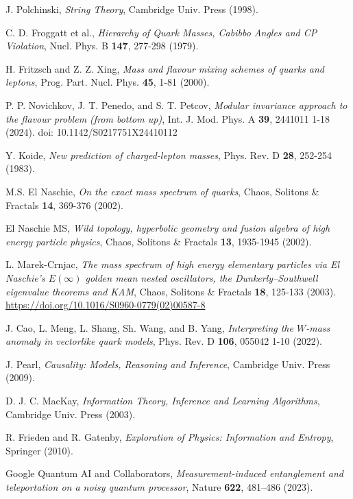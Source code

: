 \documentclass[%
  amsmath,amssymb,
  aps,
 prb,
 floatfix, showkeys
 ]{revtex4-2}
\begin{document}
\begin{thebibliography}{99}
     J. Polchinski, {\it String Theory}, Cambridge Univ. Press (1998).
 
   C. D. Froggatt et al.,
 {\it Hierarchy of Quark Masses, Cabibbo Angles and CP Violation},
   Nucl. Phys. B {\bf 147}, 277-298 (1979).
 
   H. Fritzsch and  Z. Z. Xing,
   { \it Mass and flavour mixing schemes of quarks and leptons},
   Prog. Part. Nucl. Phys. {\bf 45}, 1-81 (2000).
 
  P. P. Novichkov,  J. T. Penedo, and  S. T. Petcov, 
     {\it Modular invariance approach to the flavour problem (from bottom up)},
     Int. J. Mod. Phys. A {\bf 39},  2441011 1-18  (2024). doi: 10.1142/S0217751X24410112
     
   Y. Koide, {\it New prediction of charged‐lepton masses},
   Phys. Rev. D {\bf 28},  252-254 (1983). 
 
   M.S. El Naschie,
   {\it On the exact mass spectrum of quarks}, 
 Chaos, Solitons \& Fractals {\bf  14}, 369-376  (2002).
 
 El Naschie MS,
 {\it Wild topology, hyperbolic geometry and fusion algebra of high energy particle physics},
  Chaos, Solitons \& Fractals {\bf 13}, 1935-1945 (2002).
 
 L.  Marek-Crnjac,
 { \it The mass spectrum of high energy elementary particles via El Naschie's
  $E(\infty)$ golden mean nested oscillators, the Dunkerly–Southwell eigenvalue theorems and KAM},
   Chaos, Solitons \& Fractals  {\bf 18},  125-133 (2003).
 \url{https://doi.org/10.1016/S0960-0779(02)00587-8}
 
   J. Cao, L. Meng, L.  Shang, Sh.  Wang, and B.  Yang,
 {\it  Interpreting the $W$-mass anomaly in vectorlike quark models},  
  Phys. Rev. D {\bf 106}, 055042  1-10 (2022).
 
 J. Pearl, {\it Causality: Models, Reasoning and Inference}, Cambridge Univ. Press (2009). 
 
   D. J. C. MacKay, {\it Information Theory, Inference and Learning Algorithms}, Cambridge Univ. Press (2003).
 
   R. Frieden and R. Gatenby, {\it Exploration of Physics: Information and Entropy}, Springer (2010).
   
   Google Quantum AI and Collaborators,
   {\it  Measurement-induced entanglement and teleportation on a noisy quantum processor},
   Nature {\bf 622}, 481–486 (2023).  %
 

\end{thebibliography}
\end{document}
